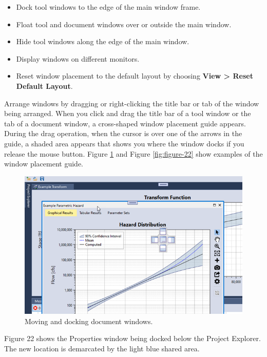 \documentclass[
]{book}
\begin{document}
\begin{itemize}
\item
  Dock tool windows to the edge of the main window frame.
\item
  Float tool and document windows over or outside the main window.
\item
  Hide tool windows along the edge of the main window.
\item
  Display windows on different monitors.
\item
  Reset window placement to the default layout by choosing \textbf{View \textgreater{} Reset Default Layout}.
\end{itemize}

Arrange windows by dragging or right-clicking the title bar or tab of the window being arranged. When you click and drag the title bar of a tool window or the tab of a document window, a cross-shaped window placement guide appears. During the drag operation, when the cursor is over one of the arrows in the guide, a shaded area appears that shows you where the window docks if you release the mouse button. Figure \ref{fig:figure-21} and Figure \ref{fig:figure-22} show examples of the window placement guide.

\begin{figure}

{\centering \includegraphics{images/figure21} 

}

\caption{Moving and docking document windows.}\label{fig:figure-21}
\end{figure}

Figure 22 shows the Properties window being docked below the Project Explorer. The new location is demarcated by the light blue shared area.
\end{document}
